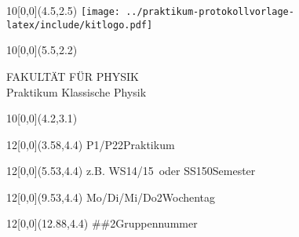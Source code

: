 \newcommand{\diameter}{20}
\newcommand{\xone}{-15}
\newcommand{\xtwo}{160}
\newcommand{\yone}{15}
\newcommand{\ytwo}{-253}

\newcommand{\hoehea}{60}
\newcommand{\hoeheb}{60}




\begin{titlepage}

    \begin{textblock}{10}[0,0](4.5,2.5)
        \texttt{[image: ../praktikum-protokollvorlage-latex/include/kitlogo.pdf]}
    \end{textblock}
    \begin{textblock}{10}[0,0](5.5,2.2)
        \begin{flushright}
            \Large FAKULTÄT FÜR PHYSIK\\Praktikum Klassische Physik
        \end{flushright}
    \end{textblock}

    \begin{textblock}{10}[0,0](4.2,3.1)
    \end{textblock}

    \Large
    \begin{textblock}{12}[0,0](3.58,4.4)
                    {P1/P2}{2}{Praktikum}
    \end{textblock}
    \begin{textblock}{12}[0,0](5.53,4.4)
        {z.B. \glqq WS14/15\grqq\ oder \glqq SS15\grqq}{0}{Semester}
    \end{textblock}
    \begin{textblock}{12}[0,0](9.53,4.4)
                    {Mo/Di/Mi/Do}{2}{Wochentag}
    \end{textblock}
    \begin{textblock}{12}[0,0](12.88,4.4)
                   {\#\#}{2}{Gruppennummer}
    \end{textblock}


\end{titlepage}
